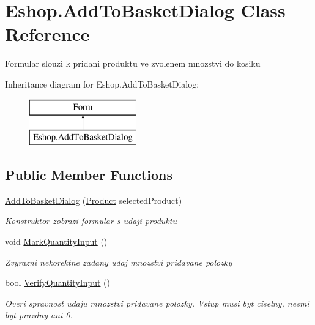 \hypertarget{class_eshop_1_1_add_to_basket_dialog}{}\section{Eshop.\+Add\+To\+Basket\+Dialog Class Reference}
\label{class_eshop_1_1_add_to_basket_dialog}


Formular slouzi k pridani produktu ve zvolenem mnozstvi do kosiku  


Inheritance diagram for Eshop.\+Add\+To\+Basket\+Dialog\+:\begin{figure}[H]
\begin{center}
\leavevmode
\includegraphics[height=2.000000cm]{class_eshop_1_1_add_to_basket_dialog}
\end{center}
\end{figure}
\subsection*{Public Member Functions}
\begin{DoxyCompactItemize}
\item 
\mbox{\hyperlink{class_eshop_1_1_add_to_basket_dialog_a037b528b8c09773c3f2201b320925598}{Add\+To\+Basket\+Dialog}} (\mbox{\hyperlink{class_eshop_1_1_product}{Product}} selected\+Product)
\begin{DoxyCompactList}\small\item\em Konstruktor zobrazi formular s udaji produktu \end{DoxyCompactList}\item 
void \mbox{\hyperlink{class_eshop_1_1_add_to_basket_dialog_a5e2401aa42ee16c67773746bd0d8e882}{Mark\+Quantity\+Input}} ()
\begin{DoxyCompactList}\small\item\em Zvyrazni nekorektne zadany udaj mnozstvi pridavane polozky \end{DoxyCompactList}\item 
bool \mbox{\hyperlink{class_eshop_1_1_add_to_basket_dialog_ade7089c2b6b69764b7da1285078dbc37}{Verify\+Quantity\+Input}} ()
\begin{DoxyCompactList}\small\item\em Overi spravnost udaju mnozstvi pridavane polozky. Vstup musi byt ciselny, nesmi byt prazdny ani 0. \end{DoxyCompactList}\end{DoxyCompactItemize}
